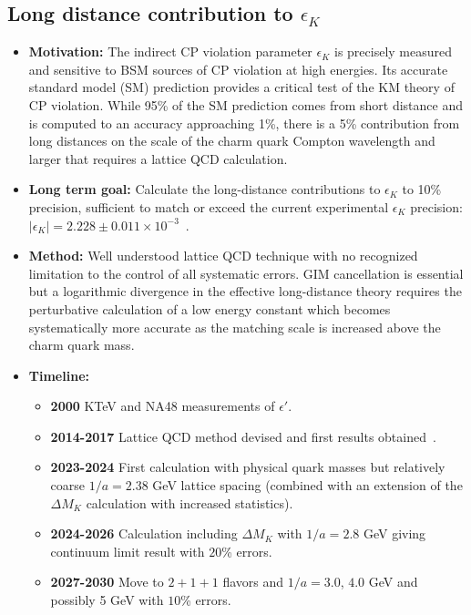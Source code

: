 \documentclass[12pt,hyperpdf]{article}
\begin{document}
\subsection{Long distance contribution to $\epsilon_K$}
\begin{itemize}
    \item{\bf Motivation:} The indirect CP violation parameter $\epsilon_K$ is precisely 
    measured and sensitive to BSM sources of CP violation at high energies. Its 
    accurate standard model (SM) prediction provides a critical test of the KM 
    theory of CP violation.  While 95\% of the SM prediction comes from short 
    distance and is computed to an accuracy approaching 1\%, there is a 5\% 
    contribution from long distances on the scale of the charm quark Compton 
    wavelength and larger that requires a lattice QCD calculation.
    \item{\bf Long term goal:} Calculate the long-distance contributions to $\epsilon_K$ 
    to 10\% precision, sufficient to match or exceed the current experimental 
    $\epsilon_K$ precision: $|\epsilon_K|=2.228\pm 0.011 \times 10^{-3}$~\cite{ParticleDataGroup:2022pth}.
    \item{\bf Method:} Well understood lattice QCD technique with no recognized 
    limitation to the control of all systematic errors. GIM cancellation is essential 
    but a logarithmic divergence in the effective long-distance theory requires the 
    perturbative calculation of a low energy constant which becomes systematically 
    more accurate as the matching scale is increased above the charm quark mass.
\item{\bf Timeline:}
\begin{itemize}
    \item{\bf 2000} KTeV and NA48 measurements of $\epsilon'$.
    \item{\bf 2014-2017} Lattice QCD method devised and first results 
    obtained~\cite{Christ:2015phf}. 
    \item{\bf 2023-2024} First calculation with physical quark masses but relatively 
    coarse $1/a=2.38$ GeV lattice spacing (combined with an extension of the
    $\Delta M_K$ calculation with increased statistics).
    \item{\bf 2024-2026} Calculation including $\Delta M_K$ with $1/a = 2.8$ GeV 
    giving continuum limit result with $20$\% errors. 
    \item{\bf 2027-2030} Move to $2+1+1$ flavors and $1/a = 3.0$, $4.0$
    GeV and possibly 5 GeV with $10$\% errors. 
\end{itemize}
\end{itemize}
\end{document}

